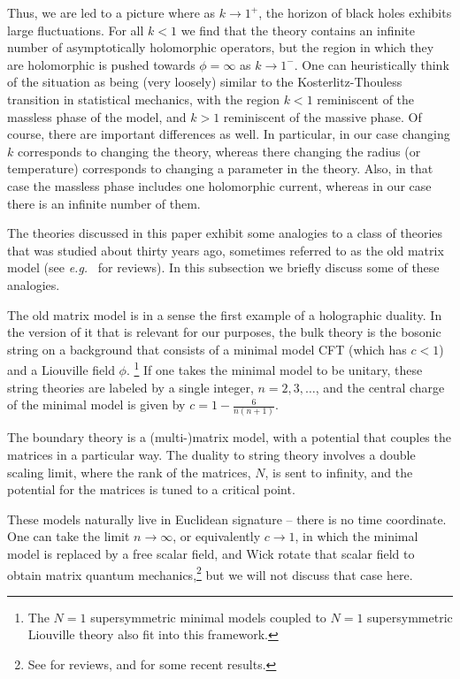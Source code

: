 \documentclass[12pt]{article}
\def\eg{{e.g.}}
\numberwithin{equation}{section}
\def\eg{{\it e.g.}}
\def\eg{{\it e.g.}}
\begin{document}
Thus, we are led to a picture where as $k\to1^+$, the horizon of black holes exhibits large fluctuations. For all $k<1$ we find that the theory contains an infinite number of asymptotically holomorphic operators, but the region in which they are holomorphic is pushed towards $\phi=\infty$ as $k\to1^-$. One can heuristically think of the situation as being (very loosely) similar to the Kosterlitz-Thouless transition in statistical mechanics, with the region $k<1$ reminiscent of the massless phase of the model, and $k>1$ reminiscent of the massive phase. 
%
Of course, there are important differences as well. In particular, in our case changing $k$ corresponds to changing the theory, whereas there changing the radius (or temperature) corresponds to changing a parameter in the theory. Also, in that case the massless phase includes one holomorphic current, whereas in our case there is an infinite number of them.





\label{sec:clt1}

The theories discussed in this paper exhibit some analogies to a class of theories that was studied about thirty years ago, sometimes referred to as the old matrix model (see \eg~ for reviews). In this subsection we briefly discuss some of these analogies. 

The old matrix model is in a sense the first example of a holographic duality. In the version of it that is relevant for our purposes, the bulk theory is the bosonic string on a background that consists of a minimal model CFT (which has $c<1$) and a Liouville field $\phi$.%
\footnote{The $N=1$ supersymmetric minimal models coupled to $N=1$ supersymmetric Liouville theory also fit into this framework.}
If one takes the minimal model to be unitary, these string theories are labeled by a single integer, $n=2,3,\dots$, and the central charge of the minimal model is given by $c=1-\frac6{n(n+1)}$. 

The boundary theory is a (multi-)matrix model, with a potential that couples the matrices in a particular way. The duality to string theory involves a double scaling limit, where the rank of the matrices, $N$, is sent to infinity, and the potential for the matrices is tuned to a critical point. 

These models naturally live in Euclidean signature -- there is no time coordinate. One can take the limit $n\to\infty$, or equivalently $c\to 1$, in which the minimal model is replaced by a free scalar field, and Wick rotate that scalar field to obtain matrix quantum mechanics,\footnote{See  for reviews, and  for some recent results.} but we will not discuss that case here. 
\end{document}
